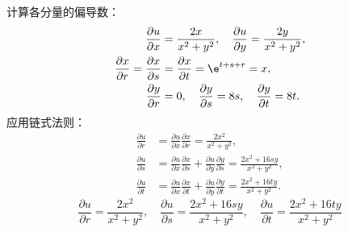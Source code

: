 \begin{solution}

    计算各分量的偏导数：
    \begin{equation}
        \begin{aligned}
            \frac{\partial u}{\partial x}                                 & = \frac{2x}{x^2 + y^2}, \quad \frac{\partial u}{\partial y} = \frac{2y}{x^2 + y^2},      \\
            \frac{\partial x}{\partial r} = \frac{\partial x}{\partial s} & = \frac{\partial x}{\partial t} = \e^{t+s+r} = x,                                        \\
            \frac{\partial y}{\partial r}                                 & = 0, \quad \frac{\partial y}{\partial s} = 8s, \quad \frac{\partial y}{\partial t} = 8t.
        \end{aligned}
    \end{equation}
    应用链式法则：
    \begin{equation}
        \begin{aligned}
            \frac{\partial u}{\partial r} & = \frac{\partial u}{\partial x} \frac{\partial x}{\partial r} = \frac{2x^2}{x^2 + y^2},                                                                      \\
            \frac{\partial u}{\partial s} & = \frac{\partial u}{\partial x} \frac{\partial x}{\partial s} + \frac{\partial u}{\partial y} \frac{\partial y}{\partial s} = \frac{2x^2 + 16sy}{x^2 + y^2}, \\
            \frac{\partial u}{\partial t} & = \frac{\partial u}{\partial x} \frac{\partial x}{\partial t} + \frac{\partial u}{\partial y} \frac{\partial y}{\partial t} = \frac{2x^2 + 16ty}{x^2 + y^2}.
        \end{aligned}
    \end{equation}
    \begin{equation}
        \boxed{\frac{\partial u}{\partial r} = \frac{2x^2}{x^2 + y^2}, \quad \frac{\partial u}{\partial s} = \frac{2x^2 + 16sy}{x^2 + y^2}, \quad \frac{\partial u}{\partial t} = \frac{2x^2 + 16ty}{x^2 + y^2}}
    \end{equation}



\end{solution}
